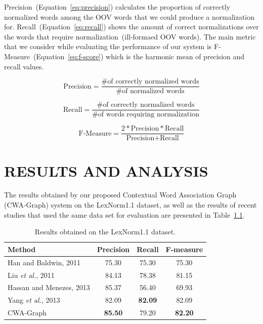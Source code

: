 \documentclass[a4paper,onesided,12pt]{report}
\begin{document}
Precision~(Equation~\ref{eq:precision}) calculates the proportion of correctly normalized words among the OOV words that we could produce a normalization for. Recall~(Equation~\ref{eq:recall}) shows the amount of correct normalizations over the words that require normalization~(ill-formaed OOV words). The main metric that we consider while evaluating the performance of our system is F-Measure~(Equation~\ref{eq:f-score}) which is the harmonic mean of precision and recall values.

\begin{equation}
\text{Precision} = \frac{ \text{\# of correctly normalized words}}{ \text{\# of normalized words}}
\label{eq:precision}
\end{equation}

\begin{equation}
\text{Recall} = \frac{\text{\# of correctly normalized words}}{\text{\# of words requiring normalization}}
\label{eq:recall}
\end{equation}

\begin{equation}
\text{F-Measure} = \frac{2 * \text{Precision} * \text{Recall} }{\text{Precision} + \text{Recall}}
\label{eq:f-score}
\end{equation}

\chapter{RESULTS AND ANALYSIS}

The results obtained by our proposed Contextual Word Association Graph (CWA-Graph) system on the LexNorm1.1 dataset,
as well as the results of recent studies that used the same data set for evaluation are presented in Table~\ref{tab:results}.

\begin{table}[thb]
  \caption{Results obtained on the LexNorm1.1 dataset.}
  \centering
  \begin{tabular}[t]{|l|c|c|c|}
    \hline
    \textbf{Method} & \textbf{Precision} & \textbf{Recall} & \textbf{F-measure} \\
    \hline
    Han and Baldwin, 2011 & 75.30 & 75.30 & 75.30 \\\hline
    Liu \textit{et al.}, 2011 & 84.13 & 78.38 & 81.15 \\\hline
    Hassan and Menezes, 2013 & 85.37 & 56.40 & 69.93 \\\hline
    Yang \textit{et al.}, 2013 & 82.09 & \textbf{82.09} & 82.09 \\\hline
    CWA-Graph   & \textbf{85.50} & 79.20 & \textbf{82.20} \\
    \hline
  \end{tabular}
  \label{tab:results}
\end{table}
\end{document}
